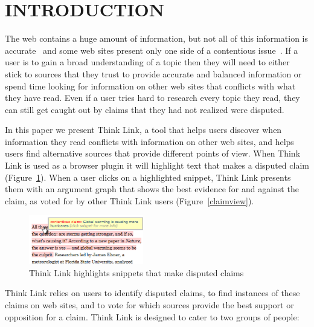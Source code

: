 \documentclass{chi2009}
\newcommand{\todo}[1]{}
\begin{document}




\section{INTRODUCTION}

The web contains a huge amount of information, but not all of this information is accurate~\cite{Mintz2002,Neumann2003,Resnik1998,Zhou2004} and some web sites present only one side of a contentious issue~\cite{Herman2002,Gentzkow2007}. If a user is to gain a broad understanding of a topic then they will need to either stick to sources that they trust to provide accurate and balanced information or spend time looking for information on other web sites that conflicts with what they have read. Even if a user tries hard to research every topic they read, they can still get caught out by claims that they had not realized were disputed.
\todo{word this better}\todo{update all screenshots}

In this paper we present Think Link, a tool that helps users discover when information they read conflicts with information on other web sites, and helps users find alternative sources that provide different points of view. When Think Link is used as a browser plugin it will highlight text that makes a disputed claim (Figure~\ref{highlight}). When a user clicks on a highlighted snippet, Think Link presents them with an argument graph that shows the best evidence for and against the claim, as voted for by other Think Link users (Figure~\ref{claimview}). 

\begin{figure}[tb]
	\begin{center}
	\includegraphics[width=5cm]{../screenshots/highlight_crop.png}
	\caption{Think Link highlights snippets that make disputed claims}
	\label{highlight}
	\end{center}
\end{figure}

Think Link relies on users to identify disputed claims, to find instances of these claims on web sites, and to vote for which sources provide the best support or opposition for a claim. 
Think Link is designed to cater to two groups of people:
\end{document}
